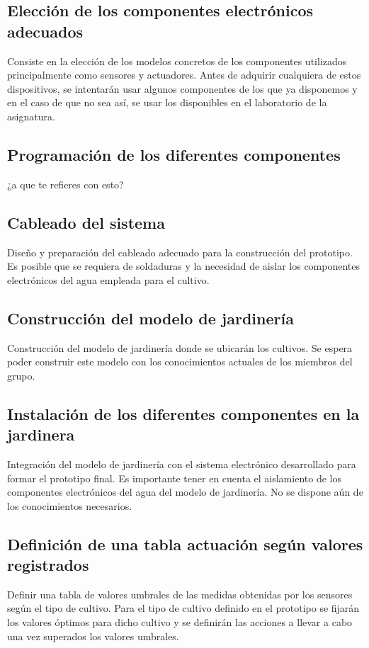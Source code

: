 \documentclass[12pt,a4paper,titlepage,oneside]{report}
\begin{document}
	\subsection*{Elección de los componentes electrónicos adecuados}	
	Consiste en la elección de los modelos concretos de los componentes utilizados principalmente como sensores y actuadores. Antes de adquirir cualquiera de estos dispositivos, se intentarán usar algunos componentes de los que ya disponemos y en el caso de que no sea así, se usar los disponibles en el laboratorio de la asignatura. 

	\subsection*{Programación de los diferentes componentes}
\color{red} ¿a que te refieres con esto? \color{black}
	
	\subsection*{Cableado del sistema}
	Diseño y preparación del cableado adecuado para la construcción del prototipo. Es posible que se requiera de soldaduras y la necesidad de aislar los componentes electrónicos del agua empleada para el cultivo.

	\subsection*{Construcción del modelo de jardinería}
	Construcción del modelo de jardinería donde se ubicarán los cultivos. Se espera poder construir este modelo con los conocimientos actuales de los miembros del grupo.

	\subsection*{Instalación de los diferentes componentes en la jardinera}
	Integración del modelo de jardinería con el sistema electrónico desarrollado para formar el prototipo final. Es importante tener en cuenta el aislamiento de los componentes electrónicos del agua del modelo de jardinería. No se dispone aún de los conocimientos necesarios.

\subsection*{Definición de una tabla actuación según valores registrados}
	Definir una tabla de valores umbrales de las medidas obtenidas por los sensores según el tipo de cultivo. Para el tipo de cultivo definido en el prototipo se fijarán los valores óptimos para dicho cultivo y se definirán las acciones a llevar a cabo una vez superados los valores umbrales.
	
\end{document}
